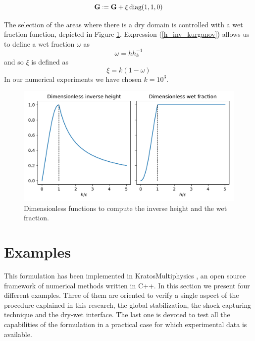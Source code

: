 \documentclass[a4paper,12pt]{article}
\newcommand{\defeq}{\mathrel{\vcenter{\baselineskip0.5ex\lineskiplimit0pt\hbox{\scriptsize.}\hbox{\scriptsize.}}}=}
\begin{document}
\begin{equation}
\mathbf{G} \defeq \mathbf{G} + \xi\,\text{diag}(1, 1, 0)
\end{equation}

The selection of the areas where there is a dry domain is controlled with a wet fraction function, depicted in Figure \ref{inverse_heihgt}. Expression (\ref{h_inv_kurganov}) allows us to define a wet fraction $\omega$ as
\begin{equation}
\omega = hh^{-1}_k
\end{equation}
and so $\xi$ is defined as
\begin{equation}
\xi = k(1-\omega)
\end{equation}
In our numerical experiments we have chosen $k=10^3$.


\begin{figure}
    \centering
    \includegraphics[width=\textwidth]{img/fig/inverse_height.pdf}
    \caption{Dimensionless functions to compute the  inverse height and the wet fraction.}
    \label{inverse_heihgt}
\end{figure}


\section{Examples} \label{sec:examples}

This formulation has been implemented in KratosMultiphysics \cite{dadvand2010, dadvand2013}, an open source framework of numerical methods written in C++.
In this section we present four different examples. Three of them are oriented to verify a single aspect of the procedure explained in this research, the global stabilization, the shock capturing technique and the dry-wet interface.
The last one is devoted to test all the capabilities of the formulation in a practical case for which experimental data is available.
\end{document}
